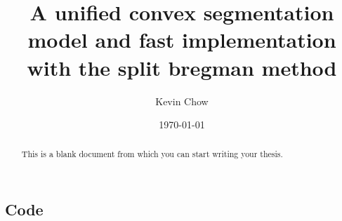 \documentclass[undefended]{sfuthesis}
\title{A unified convex segmentation model and fast implementation with the split bregman method}
\author{Kevin Chow}
\date{\today}
\begin{document}
\maketitle{}

\begin{abstract}
	This is a blank document from which you can start writing your thesis.
\end{abstract}





%
\tableofcontents%
\clearpage

%





%
%

\mainmatter%










%
%
%
%
%

\backmatter%
	

\begin{appendices} %
	\chapter{Code}
\end{appendices}
\end{document}
